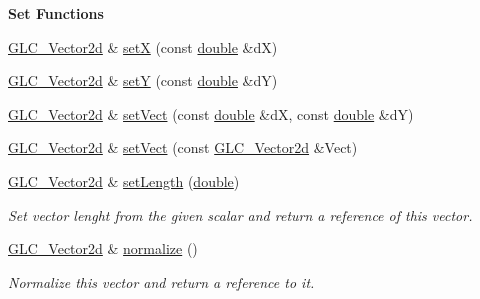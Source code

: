 \begin{Indent}{\bf Set Functions}\par
\begin{DoxyCompactItemize}
\item 
\hyperlink{class_g_l_c___vector2d}{G\-L\-C\-\_\-\-Vector2d} \& \hyperlink{class_g_l_c___vector2d_ae36d54c1241b31bcd49f2eed13542506}{set\-X} (const \hyperlink{_super_l_u_support_8h_a8956b2b9f49bf918deed98379d159ca7}{double} \&d\-X)
\item 
\hyperlink{class_g_l_c___vector2d}{G\-L\-C\-\_\-\-Vector2d} \& \hyperlink{class_g_l_c___vector2d_ade6b5e7164979e6a7649cc9220d72f1c}{set\-Y} (const \hyperlink{_super_l_u_support_8h_a8956b2b9f49bf918deed98379d159ca7}{double} \&d\-Y)
\item 
\hyperlink{class_g_l_c___vector2d}{G\-L\-C\-\_\-\-Vector2d} \& \hyperlink{class_g_l_c___vector2d_a140f8e4e162b5ca9d9f9ff55919e90ca}{set\-Vect} (const \hyperlink{_super_l_u_support_8h_a8956b2b9f49bf918deed98379d159ca7}{double} \&d\-X, const \hyperlink{_super_l_u_support_8h_a8956b2b9f49bf918deed98379d159ca7}{double} \&d\-Y)
\item 
\hyperlink{class_g_l_c___vector2d}{G\-L\-C\-\_\-\-Vector2d} \& \hyperlink{class_g_l_c___vector2d_a311c7180b498a4004df31410dc2f19a7}{set\-Vect} (const \hyperlink{class_g_l_c___vector2d}{G\-L\-C\-\_\-\-Vector2d} \&Vect)
\item 
\hyperlink{class_g_l_c___vector2d}{G\-L\-C\-\_\-\-Vector2d} \& \hyperlink{class_g_l_c___vector2d_aa834214ecf81276ace2900a0073030fc}{set\-Length} (\hyperlink{_super_l_u_support_8h_a8956b2b9f49bf918deed98379d159ca7}{double})
\begin{DoxyCompactList}\small\item\em Set vector lenght from the given scalar and return a reference of this vector. \end{DoxyCompactList}\item 
\hyperlink{class_g_l_c___vector2d}{G\-L\-C\-\_\-\-Vector2d} \& \hyperlink{class_g_l_c___vector2d_ad03a0921297e24c5a2c7081ddbe5426d}{normalize} ()
\begin{DoxyCompactList}\small\item\em Normalize this vector and return a reference to it. \end{DoxyCompactList}\end{DoxyCompactItemize}
\end{Indent}
